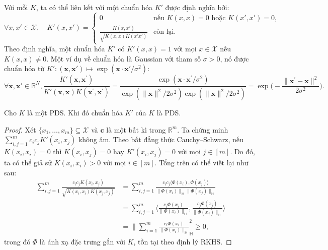 Với mỗi  $K$, ta có thể liên kết với một  chuẩn hóa $K'$
được định nghĩa bởi: \begin{equation}
  \forall x, x'\in\mathcal{X}, \quad K'(x, x') = \begin{cases}
    0 & \text{nếu $K(x, x) = 0$ hoặc $K(x', x') = 0$},\\
    \frac{K(x, x')}{\sqrt{K(x, x)K(x'x')}} & \text{còn lại.}
  \end{cases}
\end{equation} Theo định nghĩa, một  chuẩn hóa $K'$ có $K'(x, x) =
1$ với mọi $x\in \mathcal{X}$ nếu $K(x, x) \ne 0$. Một ví dụ về 
chuẩn hóa là  Gaussian với tham số $\sigma > 0$, nó được chuẩn hóa
từ $K'\colon (\mathbf{x}, \mathbf{x}') \mapsto \exp(\mathbf{x}\cdot
\mathbf{x}' / \sigma^2)$: \begin{equation}
  \forall \mathbf{x}, \mathbf{x}' \in \mathbb{R}^N, \frac{K'(\mathbf{x},
  \mathbf{x}^\prime)}{ K'(\mathbf{x}, \mathbf{x}) K(\mathbf{x}^\prime,
  \mathbf{x}^\prime) } = \frac{\exp(\mathbf{x} \cdot \mathbf{x}^\prime
  /\sigma^2)}{\exp(\lVert \mathbf{x}\rVert^2/2\sigma^2) \exp(\lVert
  \mathbf{x}\rVert^2 / 2\sigma^2)} = \exp\biggl(-\frac{\lVert \mathbf{x}^\prime
  - \mathbf{x}\rVert^2}{2\sigma^2}\biggr).
\end{equation}

\begin{lem}
  Cho $K$ là một  PDS. Khi đó  chuẩn hóa $K'$ của $K$ là
  PDS.
\end{lem}

\begin{proof}
  Xét $\{x_1,\dots, x_m\}\subseteq \mathcal{X}$ và $\mathbf{c}$ là một
   bất kì trong $\mathbb{R}^m$. Ta chứng minh
  $\sum_{i,j=1}^mc_ic_jK'(x_i,x_j)$ không âm. Theo bất đẳng thức
  Cauchy--Schwarz, nếu $K(x_i, x_i) = 0$ thì $K(x_i,x_j)=0$ hay $K'(x_i, x_j) =
  0$ với mọi $j\in[m]$. Do đó, ta có thể giả sử $K(x_i, x_i) > 0$ với mọi
  $i\in[m]$. Tổng trên có thể viết lại như sau: \begin{align}
    \sum_{i, j=1}^m\frac{c_ic_jK(x_i,x_j)}{ \sqrt{ K(x_i, x_i) K(x_j, x_j) } }
      &= \sum_{i, j = 1}^m\frac{ c_i c_j \bigl\langle \Phi(x_i), \Phi(x_j)
      \bigr\rangle }{ \lVert \Phi(x_i)\rVert_\mathbb{H} \lVert \Phi(x_j)
      \rVert_\mathbb{H} } \\
    &= \sum_{i, j = 1}^m \biggl\langle \frac{c_i\Phi(x_i)}{ \lVert \Phi(x_i)
      \rVert_\mathbb{H} }, \frac{c_j\Phi(x_j)}{ \lVert \Phi(x_j)
      \rVert_\mathbb{H} } \biggr\rangle \\
    &= \biggl\lVert \sum_{i = 1}^m \frac{c_i\Phi(x_i)}{\lVert \Phi(x_i)
    \rVert_\mathbb{H}}_\mathbb{H}^2 \ge 0,
  \end{align}trong đó $\Phi$ là ánh xạ đặc trưng gắn với $K$, tồn tại theo định
  lý RKHS.
\end{proof}

